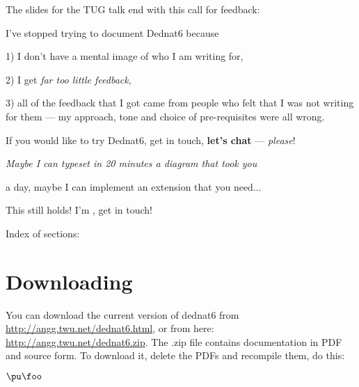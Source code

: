 \documentclass[oneside]{article}
\def\msk{\medskip}
\begin{document}
The slides for the TUG talk end with this call for feedback:

\msk

I've stopped trying to document Dednat6 because

1) I don't have a mental image of who I am writing for,

2) I get {\sl far too little feedback},

3) all of the feedback that I got came from people who felt that I was
not writing for them --- my approach, tone and choice of
pre-requisites were all wrong.

If you would like to try Dednat6, get in touch, {\bf let's chat} ---
{\sl please}!

{\sl 
Maybe I can typeset in 20 minutes a diagram that took you

a day, maybe I can implement an extension that you need...
}

\msk

This still holds! I'm , get in touch!



Index of sections:

{\makeatletter
\renewcommand*\l@section{\@dottedtocline{1}{1.5em}{2.3em}}
}




\section{Downloading}

You can download the current version of dednat6 from
\url{http://angg.twu.net/dednat6.html}, or from here:
\url{http://angg.twu.net/dednat6.zip}. The .zip file contains
documentation in PDF and source form. To download it, delete the PDFs
and recompile them, do this:


%
%
$\pu\foo$
\end{document}
